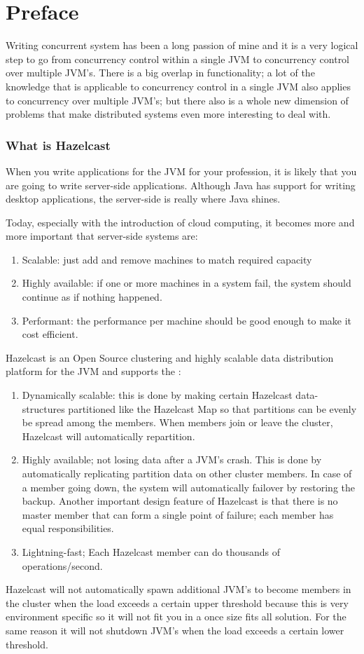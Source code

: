 \chapter*{Preface}
Writing concurrent system has been a long passion of mine and it is a very logical step to go from concurrency control within a single JVM to concurrency control over multiple JVM's. There is a big overlap in functionality; a lot of the knowledge that is applicable to concurrency control in a single JVM also applies to concurrency over multiple JVM's; but there also is a whole new dimension of problems that make distributed systems even more interesting to deal with. 
\subsection*{What is Hazelcast}
When you write applications for the JVM for your profession, it is likely that you are going to write server-side applications. Although Java has support for writing desktop applications, the server-side is really where Java shines.

Today, especially with the introduction of cloud computing, it becomes more and more important that server-side systems are:
\begin{enumerate}
\item Scalable: just add and remove machines to match required capacity 
\item Highly available: if one or more machines in a system fail, the system should continue as if nothing happened.
\item Performant: the performance per machine should be good enough to make it cost efficient.
\end{enumerate}

Hazelcast is an Open Source clustering and highly scalable data distribution platform for the JVM and supports the :
\begin{enumerate}
\item Dynamically scalable: this is done by making certain Hazelcast data-structures partitioned like the Hazelcast Map so that partitions can be evenly be spread among the members. When members join or leave the cluster, Hazelcast will automatically repartition.
\item Highly available; not losing data after a JVM's crash. This is done by automatically replicating partition data on other cluster members. In case of a member going down, the system will automatically failover by restoring the backup. Another important design feature of Hazelcast is that there is no master member that can form a single point of failure; each member has equal responsibilities.
\item Lightning-fast; Each Hazelcast member can do thousands of operations/second.
\end{enumerate}
Hazelcast will not automatically spawn additional JVM's to become members in the cluster when the load exceeds a certain upper threshold because this is very environment specific so it will not fit you in a once size fits all solution. For the same reason it will not shutdown JVM's when the load exceeds a certain lower threshold.

